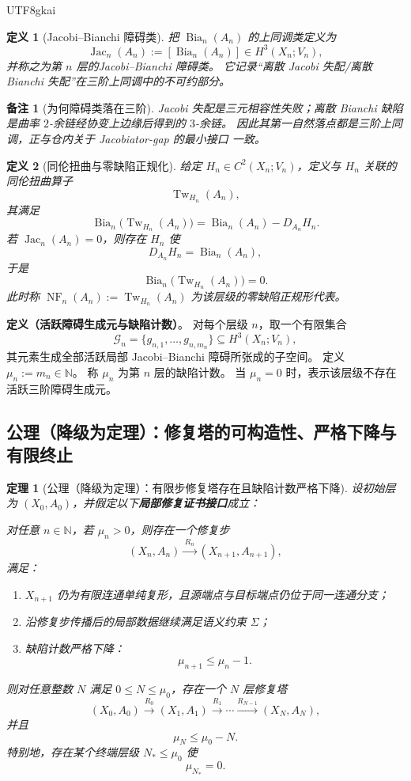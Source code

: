 \documentclass[12pt]{article}
\newtheorem{definition}{定义}[section]
\newtheorem{theorem}{定理}[section]
\newtheorem{remark}{备注}[section]
\newcommand{\NN}{\mathbb{N}}
\newcommand{\NF}{\operatorname{NF}}
\newcommand{\Tw}{\operatorname{Tw}}
\newcommand{\Bia}{\operatorname{Bia}}
\newcommand{\Jac}{\operatorname{Jac}}
\begin{document}
\begin{CJK*}{UTF8}{gkai}
\begin{definition}[Jacobi--Bianchi 障碍类]
把 $\Bia_n(A_n)$ 的上同调类定义为
\[
  \Jac_n(A_n):=[\Bia_n(A_n)]\in H^3(X_n;V_n),
\]
并称之为第 $n$ 层的\emph{Jacobi--Bianchi 障碍类}。
它记录“离散 Jacobi 失配/离散 Bianchi 失配”在三阶上同调中的不可约部分。
\end{definition}

\begin{remark}[为何障碍类落在三阶]
Jacobi 失配是三元相容性失败；离散 Bianchi 缺陷是曲率 $2$-余链经协变上边缘后得到的 $3$-余链。
因此其第一自然落点都是三阶上同调，正与仓内关于 Jacobiator-gap 的最小接口 \cite{RepoTex6JacobiGap,GaoZheng2025GFramework} 一致。
\end{remark}

\begin{definition}[同伦扭曲与零缺陷正规化]
给定 $H_n\in C^2(X_n;V_n)$，定义与 $H_n$ 关联的同伦扭曲算子
\[
  \Tw_{H_n}(A_n),
\]
其满足
\[
  \Bia_n\bigl(\Tw_{H_n}(A_n)\bigr)
  =
  \Bia_n(A_n)-D_{A_n}H_n.
\]
若 $\Jac_n(A_n)=0$，则存在 $H_n$ 使
\[
  D_{A_n}H_n=\Bia_n(A_n),
\]
于是
\[
  \Bia_n\bigl(\Tw_{H_n}(A_n)\bigr)=0.
\]
此时称 $\NF_n(A_n):=\Tw_{H_n}(A_n)$ 为该层级的\emph{零缺陷正规形代表}。
\end{definition}

\noindent\textbf{定义（活跃障碍生成元与缺陷计数）}。
对每个层级 $n$，取一个有限集合
\[
\mathcal{G}_n=\{g_{n,1},\dots,g_{n,m_n}\}\subseteq H^3(X_n;V_n),
\]
其元素生成全部活跃局部 Jacobi--Bianchi 障碍所张成的子空间。
定义 $\mu_n:=m_n\in\NN$。
称 $\mu_n$ 为第 $n$ 层的缺陷计数。
当 $\mu_n=0$ 时，表示该层级不存在活跃三阶障碍生成元。

\subsection{公理（降级为定理）：修复塔的可构造性、严格下降与有限终止}
\label{sec:tex38-tower}

\begin{theorem}[公理（降级为定理）：有限步修复塔存在且缺陷计数严格下降]
\label{thm:tex38-axiom-downgrade}
设初始层为 $(X_0,A_0)$，并假定以下\textbf{局部修复证书接口}成立：

对任意 $n\in\NN$，若 $\mu_n>0$，则存在一个修复步
\[
  (X_n,A_n)\xrightarrow{\,R_n\,}(X_{n+1},A_{n+1}),
\]
满足：
\begin{enumerate}
  \item $X_{n+1}$ 仍为有限连通单纯复形，且源端点与目标端点仍位于同一连通分支；
  \item 沿修复步传播后的局部数据继续满足语义约束 $\Sigma$；
  \item 缺陷计数严格下降：
  \[
    \mu_{n+1}\le \mu_n-1.
  \]
\end{enumerate}
则对任意整数 $N$ 满足 $0\le N\le \mu_0$，存在一个 $N$ 层修复塔
\[
  (X_0,A_0)\xrightarrow{R_0}(X_1,A_1)\xrightarrow{R_1}\cdots\xrightarrow{R_{N-1}}(X_N,A_N),
\]
并且
\[
  \mu_N\le \mu_0-N.
\]
特别地，存在某个终端层级 $N_\ast\le \mu_0$ 使
\[
  \mu_{N_\ast}=0.
\]
\end{theorem}


\end{CJK*}
\end{document}
